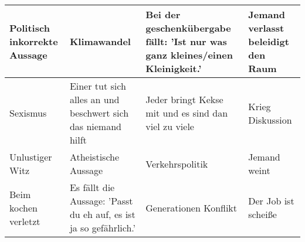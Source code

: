 \begin{table}[h]
\begin{tabularx}{\linewidth}{|X|X|X|X|}
\hline
Politisch inkorrekte Aussage & Klimawandel & Bei der geschenkübergabe fällt: 'Ist nur was ganz kleines/einen Kleinigkeit.' & Jemand verlasst beleidigt den Raum \\ \hline
Sexismus & Einer tut sich alles an und beschwert sich das niemand hilft & Jeder bringt Kekse mit und es sind dan viel zu viele & Krieg Diskussion \\ \hline
Unlustiger Witz & Atheistische Aussage & Verkehrspolitik & Jemand weint \\ \hline
Beim kochen verletzt & Es fällt die Aussage: 'Passt du eh auf, es ist ja so gefährlich.' & Generationen Konflikt & Der Job ist scheiße \\ \hline
\end{tabularx}
\end{table}
